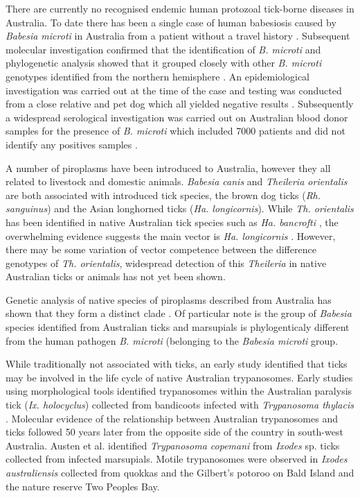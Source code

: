 \documentclass[a4paper, nobind]{templates/ociamthesis}
\begin{document}
There are currently no recognised endemic human protozoal tick-borne diseases in Australia.
To date there has been a single case of human babesiosis caused by \emph{Babesia microti} in Australia from a patient without a travel history \autocite{senanayakeFirstReportHuman2012}.
Subsequent molecular investigation confirmed that the identification of \emph{B. microti} and phylogenetic analysis showed that it grouped closely with other \emph{B. microti} genotypes identified from the northern hemisphere \autocite{papariniMolecularConfirmationFirst2014}.
An epidemiological investigation was carried out at the time of the case and testing was conducted from a close relative and pet dog which all yielded negative results \autocite{senanayakeFirstReportHuman2012}.
Subsequently a widespread serological investigation was carried out on Australian blood donor samples for the presence of \emph{B. microti} which included 7000 patients and did not identify any positives samples \autocite{faddyNoEvidenceWidespread2019}.

A number of piroplasms have been introduced to Australia, however they all related to livestock and domestic animals.
\emph{Babesia canis} and \emph{Theileria orientalis} are both associated with introduced tick species, the brown dog ticks (\emph{Rh. sanguinus}) and the Asian longhorned ticks (\emph{Ha. longicornis}).
While \emph{Th. orientalis} has been identified in native Australian tick species such as \emph{Ha. bancrofti} \autocite{lakewEndemicInfectionCattle2021}, the overwhelming evidence suggests the main vector is \emph{Ha. longicornis} \autocite{marendyHaemaphysalisLongicornisLifecycle2019}.
However, there may be some variation of vector competence between the difference genotypes of \emph{Th. orientalis}, widespread detection of this \emph{Theileria} in native Australian ticks or animals has not yet been shown.

Genetic analysis of native species of piroplasms described from Australia has shown that they form a distinct clade \autocite{barbosaSequenceAnalysesMitochondrial2019}.
Of particular note is the group of \emph{Babesia} species identified from Australian ticks and marsupials is phylogenticaly different from the human pathogen \emph{B. microti} (belonging to the \emph{Babesia microti} group.

While traditionally not associated with ticks, an early study identified that ticks may be involved in the life cycle of native Australian trypanosomes.
Early studies using morphological tools identified trypanosomes within the Australian paralysis tick (\emph{Ix. holocyclus}) collected from bandicoots infected with \emph{Trypanosoma thylacis} \autocite{mackerrasHaematozoaAustralianMammals1959}.
Molecular evidence of the relationship between Australian trypanosomes and ticks followed 50 years later from the opposite side of the country in south-west Australia.
Austen et al. \autocite*{austenVectorTrypanosomaCopemani2011} identified \emph{Trypanosoma copemani} from \emph{Ixodes} sp. ticks collected from infected marsupials.
Motile trypanosomes were observed in \emph{Ixodes australiensis} collected from quokkas and the Gilbert's potoroo on Bald Island and the nature reserve Two Peoples Bay.
\end{document}
